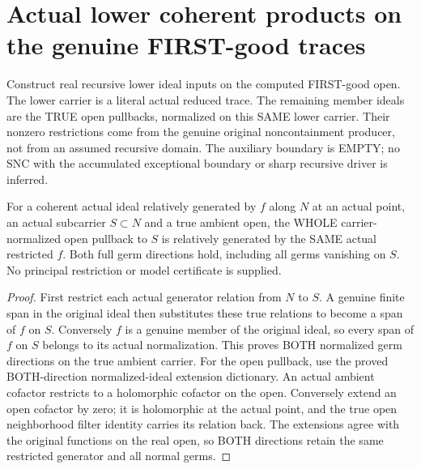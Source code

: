 \section{Actual lower coherent products on the genuine FIRST-good traces}

Construct real recursive lower ideal inputs on the computed FIRST-good
open. The lower carrier is a literal actual reduced trace. The remaining
member ideals are the TRUE open pullbacks, normalized on this SAME lower
carrier. Their nonzero restrictions come from the genuine original
noncontainment producer, not from an assumed recursive domain. The
auxiliary boundary is EMPTY; no SNC with the accumulated exceptional
boundary or sharp recursive driver is inferred.

\begin{lemma}
\label{hir:sharp-actual-subcarrier-open-relative-generator}
\leanok
For a coherent actual ideal relatively generated by $f$ along $N$ at an
actual point, an actual subcarrier $S\subset N$ and a true ambient open,
the WHOLE carrier-normalized open pullback to $S$ is relatively generated
by the SAME actual restricted $f$. Both full germ directions hold,
including all germs vanishing on $S$. No principal restriction or model
certificate is supplied.
\end{lemma}
\begin{proof}
First restrict each actual generator relation from $N$ to $S$. A genuine
finite span in the original ideal then substitutes these true relations
to become a span of $f$ on $S$. Conversely $f$ is a genuine member of the
original ideal, so every span of $f$ on $S$ belongs to its actual
normalization. This proves BOTH normalized germ directions on the true
ambient carrier. For the open pullback, use the proved BOTH-direction
normalized-ideal extension dictionary. An actual ambient cofactor restricts
to a holomorphic cofactor on the open. Conversely extend an open cofactor
by zero; it is holomorphic at the actual point, and the true open
neighborhood filter identity carries its relation back. The extensions
agree with the original functions on the real open, so BOTH directions
retain the same restricted generator and all normal germs.
\end{proof}

